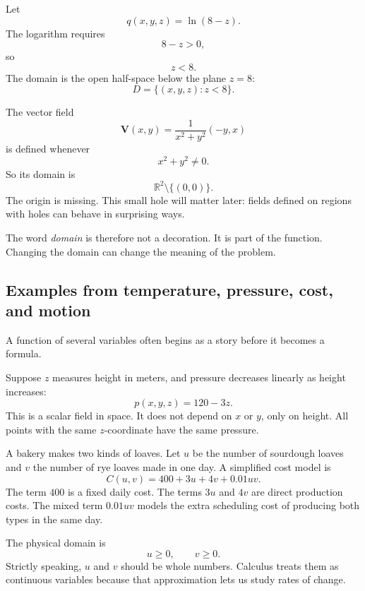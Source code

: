 \begin{example}
Let
\[
    q(x,y,z)=\ln(8-z).
\]
The logarithm requires
\[
    8-z>0,
\]
so
\[
    z<8.
\]
The domain is the open half-space below the plane \(z=8\):
\[
    D=\{(x,y,z):z<8\}.
\]
\end{example}

\begin{example}
The vector field
\[
    \mathbf V(x,y)=\frac{1}{x^2+y^2}(-y,x)
\]
is defined whenever
\[
    x^2+y^2\ne0.
\]
So its domain is
\[
    \mathbb R^2\setminus\{(0,0)\}.
\]
The origin is missing.  This small hole will matter later: fields defined on regions with
holes can behave in surprising ways.
\end{example}

The word \emph{domain} is therefore not a decoration.  It is part of the function.
Changing the domain can change the meaning of the problem.

\subsection{Examples from temperature, pressure, cost, and motion}

A function of several variables often begins as a story before it becomes a formula.

\begin{example}
Suppose \(z\) measures height in meters, and pressure decreases linearly as height
increases:
\[
    p(x,y,z)=120-3z.
\]
This is a scalar field in space.  It does not depend on \(x\) or \(y\), only on height.
All points with the same \(z\)-coordinate have the same pressure.
\end{example}

\begin{example}
A bakery makes two kinds of loaves.  Let \(u\) be the number of sourdough loaves and
\(v\) the number of rye loaves made in one day.  A simplified cost model is
\[
    C(u,v)=400+3u+4v+0.01uv.
\]
The term \(400\) is a fixed daily cost.  The terms \(3u\) and \(4v\) are direct production
costs.  The mixed term \(0.01uv\) models the extra scheduling cost of producing both
types in the same day.

The physical domain is
\[
    u\ge0,\qquad v\ge0.
\]
Strictly speaking, \(u\) and \(v\) should be whole numbers.  Calculus treats them as
continuous variables because that approximation lets us study rates of change.
\end{example}


